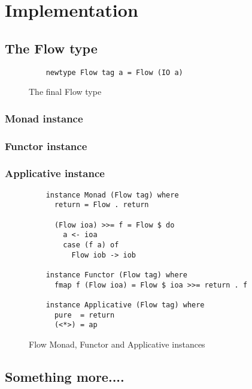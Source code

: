 \section{Implementation}
\label{chapter:implementation}
\subsection{The Flow type}
\label{sec:flow}
\begin{figure}[h]
  \lstset{language=Haskell}
  \begin{lstlisting}
    newtype Flow tag a = Flow (IO a)
  \end{lstlisting}
  \caption{The final Flow type}
  \label{fig:final_flow}
\end{figure}

\subsubsection{Monad instance}

\subsubsection{Functor instance}

\subsubsection{Applicative instance}

\begin{figure}[h]
  \lstset{language=Haskell}
  \begin{lstlisting}
    instance Monad (Flow tag) where
      return = Flow . return

      (Flow ioa) >>= f = Flow $ do
        a <- ioa
        case (f a) of
          Flow iob -> iob

    instance Functor (Flow tag) where
      fmap f (Flow ioa) = Flow $ ioa >>= return . f

    instance Applicative (Flow tag) where
      pure  = return
      (<*>) = ap
  \end{lstlisting}
  \caption{Flow Monad, Functor and Applicative instances}
  \label{fig:flow_instances}
\end{figure}
\subsection{Something more....}
